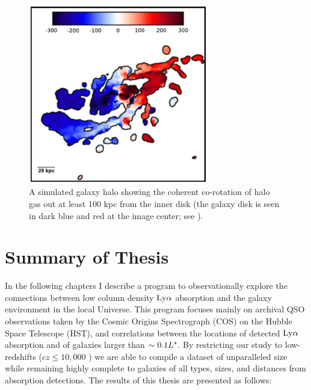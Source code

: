 \begin{figure}[t!]
        \centering
        \vspace{0pt}
        \includegraphics[width=0.7\textwidth]{Introduction/figures/stewart2011_comoving_gas.jpg}
        \caption{\small{A simulated galaxy halo showing the coherent co-rotation of halo gas out at least 100 kpc from the inner disk (the galaxy disk is seen in dark blue and red at the image center; see \cite{stewart2011a}).}}
        \vspace{5pt}
        \label{stewart_rotation}
\end{figure}




\section{Summary of Thesis}
In the following chapters I describe a program to observationally explore the connections between low column density $\rm Ly\alpha$ absorption and the galaxy environment in the local Universe. This program focuses mainly on archival QSO observations taken by the Cosmic Origins Spectrograph (COS) on the Hubble Space Telescope (HST), and correlations between the locations of detected $\rm Ly\alpha$ absorption and of galaxies larger than $\sim 0.1 L^{\**}$. By restricting our study to low-redshifts ($cz \leq 10,000$ \kms) we are able to compile a dataset of unparalleled size while remaining highly complete to galaxies of all types, sizes, and distances from absorption detections. The results of this thesis are presented as follows:

